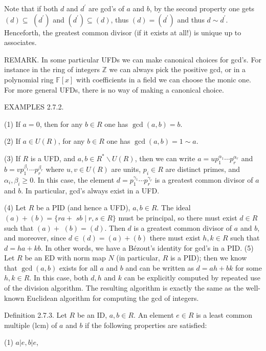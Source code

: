 Note that if both $d$ and $d^{\prime}$ are gcd's of $a$ and $b$, by the second property one gets $(d) \subseteq$ $\left(d^{\prime}\right)$ and $\left(d^{\prime}\right) \subseteq(d)$, thus $(d)=\left(d^{\prime}\right)$ and thus $d \sim d^{\prime}$. Henceforth, the greatest common divisor (if it exists at all!) is unique up to associates.

REMARK. In some particular UFDs we can make canonical choices for gcd's. For instance in the ring of integers $\mathbb{Z}$ we can always pick the positive gcd, or in a polynomial ring $\mathbb{F}[x]$ with coefficients in a field we can choose the monic one. For more general UFDs, there is no way of making a canonical choice.

EXAMPLES 2.7.2.

(1) If $a=0$, then for any $b \in R$ one has $\operatorname{gcd}(a, b)=b$.

(2) If $a \in U(R)$, for any $b \in R$ one has $\operatorname{gcd}(a, b)=1 \sim a$.

(3) If $R$ is a UFD, and $a, b \in R^{*} \backslash U(R)$, then we can write $a=u p_{1}^{\alpha_{1}} \cdots p_{r}^{\alpha_{r}}$ and $b=v p_{1}^{\beta_{1}} \cdots p_{r}^{\beta_{r}}$ where $u, v \in U(R)$ are units, $p_{i} \in R$ are distinct primes, and $\alpha_{i}, \beta_{i} \geq 0$. In this case, the element $d=p_{1}^{\gamma_{1}} \cdots p_{r}^{\gamma_{r}}$ is a greatest common divisor of $a$ and $b$. In particular, gcd's always exist in a UFD.

(4) Let $R$ be a PID (and hence a UFD), $a, b \in R$. The ideal $(a)+(b)=\{r a+$ $s b \mid r, s \in R\}$ must be principal, so there must exist $d \in R$ such that $(a)+$ $(b)=(d)$. Then $d$ is a greatest common divisor of $a$ and $b$, and moreover, since $d \in(d)=(a)+(b)$ there must exist $h, k \in R$ such that $d=h a+k b$. In other words, we have a Bézout's identity for gcd's in a PID. (5) Let $R$ be an ED with norm map $N$ (in particular, $R$ is a PID); then we know that $\operatorname{gcd}(a, b)$ exists for all $a$ and $b$ and can be written as $d=a h+b k$ for some $h, k \in R$. In this case, both $d, h$ and $k$ can be explicitly computed by repeated use of the division algorithm. The resulting algorithm is exactly the same as the well-known Euclidean algorithm for computing the gcd of integers.

Definition 2.7.3. Let $R$ be an ID, $a, b \in R$. An element $e \in R$ is a least common multiple (lcm) of $a$ and $b$ if the following properties are satisfied:

(1) $a|e, b| e$,

